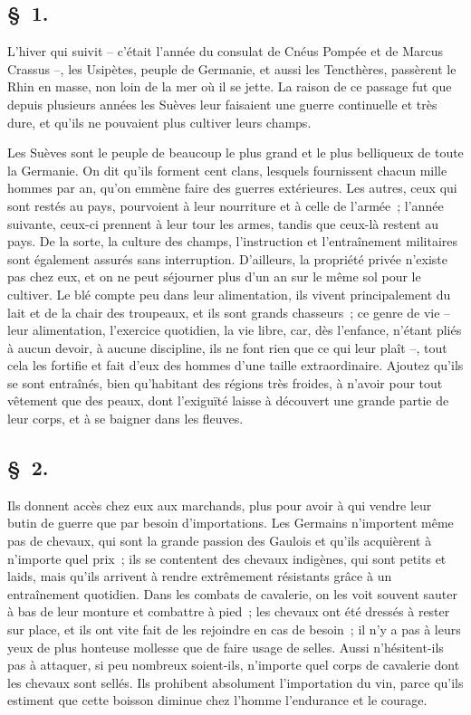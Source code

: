 \documentclass[french,twoside]{book} %
\begin{document}
\subsection[{§ 1.}]{ \textsc{§ 1.} }
\noindent L'hiver qui suivit – c’était l’année du consulat de Cnéus Pompée et de Marcus Crassus –, les Usipètes, peuple de Germanie, et aussi les Tencthères, passèrent le Rhin en masse, non loin de la mer où il se jette. La raison de ce passage fut que depuis plusieurs années les Suèves leur faisaient une guerre continuelle et très dure, et qu’ils ne pouvaient plus cultiver leurs champs.\par
\par
Les Suèves sont le peuple de beaucoup le plus grand et le plus belliqueux de toute la Germanie. On dit qu’ils forment cent clans, lesquels fournissent chacun mille hommes par an, qu’on emmène faire des guerres extérieures. Les autres, ceux qui sont restés au pays, pourvoient à leur nourriture et à celle de l’armée ; l’année suivante, ceux-ci prennent à leur tour les armes, tandis que ceux-là restent au pays. De la sorte, la culture des champs, l’instruction et l’entraînement militaires sont également assurés sans interruption. D'ailleurs, la propriété privée n’existe pas chez eux, et on ne peut séjourner plus d’un an sur le même sol pour le cultiver. Le blé compte peu dans leur alimentation, ils vivent principalement du lait et de la chair des troupeaux, et ils sont grands chasseurs ; ce genre de vie – leur alimentation, l’exercice quotidien, la vie libre, car, dès l’enfance, n’étant pliés à aucun devoir, à aucune discipline, ils ne font rien que ce qui leur plaît –, tout cela les fortifie et fait d’eux des hommes d’une taille extraordinaire. Ajoutez qu’ils se sont entraînés, bien qu’habitant des régions très froides, à n’avoir pour tout vêtement que des peaux, dont l’exiguïté laisse à découvert une grande partie de leur corps, et à se baigner dans les fleuves.
\subsection[{§ 2.}]{ \textsc{§ 2.} }
\noindent Ils donnent accès chez eux aux marchands, plus pour avoir à qui vendre leur butin de guerre que par besoin d’importations. Les Germains n’importent même pas de chevaux, qui sont la grande passion des Gaulois et qu’ils acquièrent à n’importe quel prix ; ils se contentent des chevaux indigènes, qui sont petits et laids, mais qu’ils arrivent à rendre extrêmement résistants grâce à un entraînement quotidien. Dans les combats de cavalerie, on les voit souvent sauter à bas de leur monture et combattre à pied ; les chevaux ont été dressés à rester sur place, et ils ont vite fait de les rejoindre en cas de besoin ; il n’y a pas à leurs yeux de plus honteuse mollesse que de faire usage de selles. Aussi n’hésitent-ils pas à attaquer, si peu nombreux soient-ils, n’importe quel corps de cavalerie dont les chevaux sont sellés. Ils prohibent absolument l’importation du vin, parce qu’ils estiment que cette boisson diminue chez l’homme l’endurance et le courage.
\end{document}
